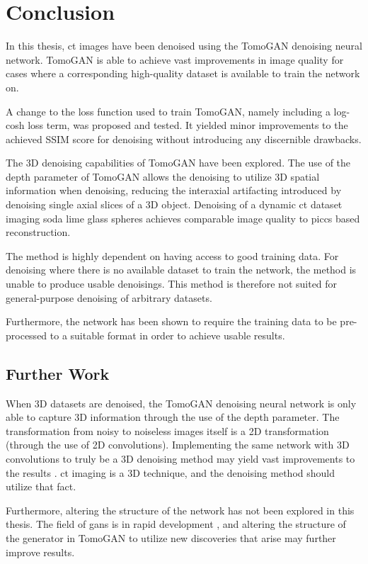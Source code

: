 \chapter{Conclusion}
\label{sec:conclusion}
In this thesis, \gls{ct} images have been denoised using the TomoGAN denoising neural network. TomoGAN is able to achieve vast improvements in image quality for cases where a corresponding high-quality dataset is available to train the network on. 

A change to the loss function used to train TomoGAN, namely including a log-cosh loss term, was proposed and tested. It yielded minor improvements to the achieved SSIM score for denoising without introducing any discernible drawbacks. 

The 3D denoising capabilities of TomoGAN have been explored. The use of the depth parameter of TomoGAN allows the denoising to utilize 3D spatial information when denoising, reducing the interaxial artifacting introduced by denoising single axial slices of a 3D object. Denoising of a dynamic \gls{ct} dataset imaging soda lime glass spheres achieves comparable image quality to \gls{piccs} based reconstruction. 

The method is highly dependent on having access to good training data. For denoising where there is no available dataset to train the network, the method is unable to produce usable denoisings. This method is therefore not suited for general-purpose denoising of arbitrary datasets.

Furthermore, the network has been shown to require the training data to be pre-processed to a suitable format in order to achieve usable results. 


\section{Further Work}
When 3D datasets are denoised, the TomoGAN denoising neural network is only able to capture 3D information through the use of the depth parameter. The transformation from noisy to noiseless images itself is a 2D transformation (through the use of 2D convolutions). Implementing the same network with 3D convolutions to truly be a 3D denoising method may yield vast improvements to the results \cite{8353466}. \Gls{ct} imaging is a 3D technique, and the denoising method should utilize that fact.

Furthermore, altering the structure of the network has not been explored in this thesis. The field of \glspl{gan} is in rapid development \cite{goodfellow2020gan}, and altering the structure of the generator in TomoGAN to utilize new discoveries that arise may further improve results. 

